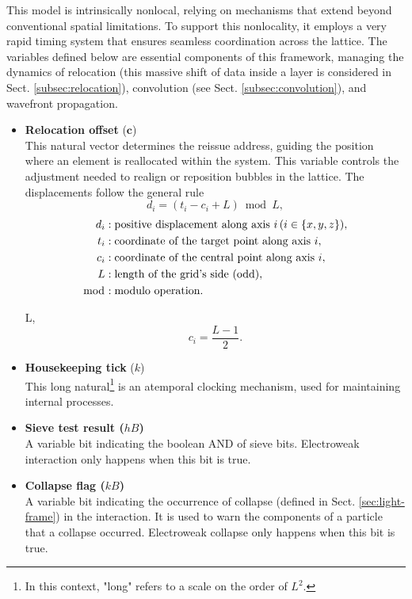 \documentclass[12pt,english]{article}
\begin{document}
This model is intrinsically nonlocal, relying on mechanisms that extend beyond conventional spatial limitations. To support this nonlocality, it employs a very rapid timing system that ensures seamless coordination across the lattice. The variables defined below are essential components of this framework, managing the dynamics of relocation (this massive shift of data inside a layer is considered in Sect. \ref{subsec:relocation}), convolution (see Sect. \ref{subsec:convolution}), and wavefront propagation.
\begin{itemize}
    \item \textbf{Relocation offset} ($\textbf{c}$)\\
 This natural vector determines the reissue address, guiding the position where an element is reallocated within the system. This variable controls the adjustment needed to realign or reposition bubbles in the lattice. The displacements follow the general rule
 \[
d_i = (t_i - c_i + L) \bmod L,
\]
\begin{align*}
d_i & : \text{positive displacement along axis } i \, (i \in \{x, y, z\}), \\
t_i & : \text{coordinate of the target point along axis } i, \\
c_i & : \text{coordinate of the central point along axis } i, \\
L & : \text{length of the grid's side (odd)}, \\
\bmod & : \text{modulo operation}.
\end{align*}

 L, 
\[
c_i = \frac{L - 1}{2}.
\]

    \item \textbf{Housekeeping tick} ($k$)\\
 This long natural\footnote{In this context, "long" refers to a scale on the order of $L^2$.} is an atemporal clocking mechanism, used for maintaining internal processes.
 
   \item \textbf{Sieve test result ($hB$)} \\
    A variable bit indicating the boolean AND of sieve bits. Electroweak interaction only happens when this bit is true.
    
    \item \textbf{Collapse flag ($kB$)} \\
    A variable bit indicating the occurrence of collapse (defined in Sect. \ref{sec:light-frame}) in the interaction. It is used to warn the components of a particle that a collapse occurred. Electroweak collapse only happens when this bit is true.

\end{itemize}
\end{document}

